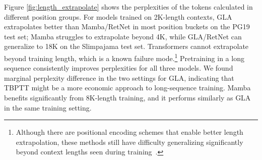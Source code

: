 Figure \ref{fig:length_extrapolate} shows the perplexities of the tokens calculated in different position groups.  For models trained on 2K-length contexts, GLA extrapolates better than Mamba/RetNet in most position buckets on the PG19 test set; Mamba struggles to extrapolate beyond 4K, while GLA/RetNet can generalize to 18K on the Slimpajama test set.
Transformers cannot extrapolate beyond training length, which is a known failure mode.\footnote
{Although there are positional encoding schemes that enable better length extrapolation, these methods still have difficulty generalizing significantly beyond context lengths seen during training~\citep{alibi2021,xpos,fire2024}.} Pretraining in a long sequence consistently improves perplexities for all three models. We found marginal perplexity difference in the two settings for GLA, indicating that TBPTT might be a more economic approach to long-sequence training. Mamba benefits significantly from 8K-length training, and it performs similarly as GLA in the same training setting.
\vspace{-2mm}
